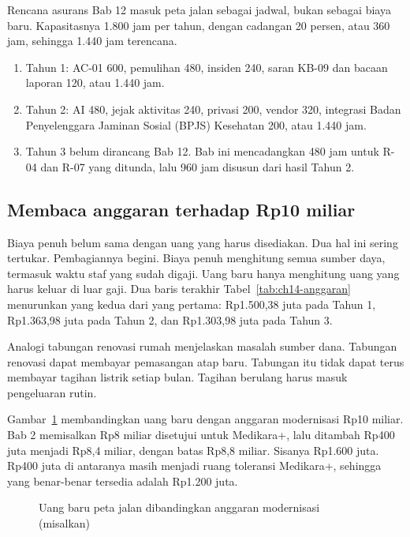Rencana asurans Bab 12 masuk peta jalan sebagai jadwal, bukan sebagai biaya baru. Kapasitasnya
1.800 jam per tahun, dengan cadangan 20 persen, atau 360 jam, sehingga 1.440 jam terencana.
\begin{enumerate}
  \item Tahun 1: AC-01 600, pemulihan 480, insiden 240, saran KB-09 dan bacaan laporan 120, atau
  1.440 jam.
  \item Tahun 2: AI 480, jejak aktivitas 240, privasi 200, vendor 320, integrasi Badan Penyelenggara
  Jaminan Sosial (BPJS) Kesehatan 200, atau 1.440 jam.
  \item Tahun 3 belum dirancang Bab 12. Bab ini mencadangkan 480 jam untuk R-04 dan R-07 yang
  ditunda, lalu 960 jam disusun dari hasil Tahun 2.
\end{enumerate}

\subsection*{Membaca anggaran terhadap Rp10 miliar}

Biaya penuh belum sama dengan uang yang harus disediakan. Dua hal ini sering tertukar.
Pembagiannya begini. Biaya penuh menghitung semua sumber daya, termasuk waktu staf yang sudah
digaji. Uang baru hanya menghitung uang yang harus keluar di luar gaji. Dua baris terakhir
Tabel~\ref{tab:ch14-anggaran} menurunkan yang kedua dari yang pertama: Rp1.500,38 juta pada Tahun
1, Rp1.363,98 juta pada Tahun 2, dan Rp1.303,98 juta pada Tahun 3.

Analogi tabungan renovasi rumah menjelaskan masalah sumber dana. Tabungan renovasi dapat membayar
pemasangan atap baru. Tabungan itu tidak dapat terus membayar tagihan listrik setiap bulan.
Tagihan berulang harus masuk pengeluaran rutin.

Gambar~\ref{fig:ch14-anggaran} membandingkan uang baru dengan anggaran modernisasi Rp10 miliar. Bab
2 memisalkan Rp8 miliar disetujui untuk Medikara+, lalu ditambah Rp400 juta menjadi Rp8,4 miliar,
dengan batas Rp8,8 miliar. Sisanya Rp1.600 juta. Rp400 juta di antaranya masih menjadi ruang
toleransi Medikara+, sehingga yang benar-benar tersedia adalah Rp1.200 juta.

\begin{figure}[!htb]
  \centering
  
  \caption{Uang baru peta jalan dibandingkan anggaran modernisasi (misalkan)}
  \label{fig:ch14-anggaran}
\end{figure}

